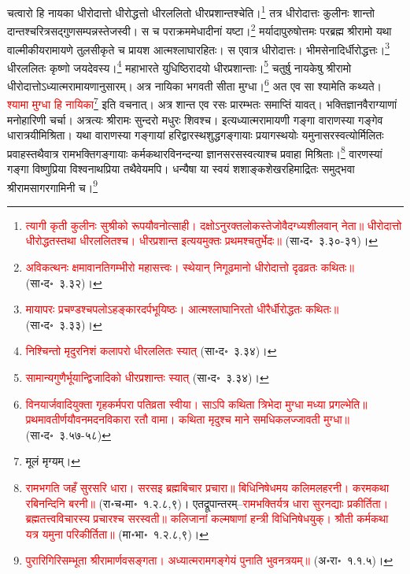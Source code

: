 \begin{sloppypar}\justifying\noindent\hspace{10mm} चत्वारो हि नायका धीरोदात्तो धीरोद्धत्तो धीरललितो धीरप्रशान्तश्चेति।\footnote{\textcolor{red}{त्यागी कृती कुलीनः सुश्रीको रूपयौवनोत्साही। दक्षोऽनुरक्तलोकस्तेजोवैदग्ध्यशीलवान् नेता॥ धीरोदात्तो धीरोद्धतस्तथा धीरललितश्च। धीरप्रशान्त इत्ययमुक्तः प्रथमश्चतुर्भेदः॥} (सा॰द॰~३.३०-३१)।} तत्र धीरोदात्तः कुलीनः शान्तो दान्तश्चरित्र\-सद्गुण\-सम्पन्नस्तेजस्वी। स च पराक्रम\-मेधादीनां यष्टा।\footnote{\textcolor{red}{अविकत्थनः क्षमावानतिगम्भीरो महासत्त्वः। स्थेयान् निगूढमानो धीरोदात्तो दृढव्रतः कथितः॥} (सा॰द॰~३.३२)।} मर्यादा\-पुरुषोत्तमः पर\-ब्रह्म श्रीरामो यथा वाल्मीकीय\-रामायणे तुलसी\-कृते च प्रायश आत्म\-श्लाघा\-रहितः। स एवात्र धीरोदात्तः। भीमसेनादिर्धीरोद्धत्तः।\footnote{\textcolor{red}{मायापरः प्रचण्डश्चपलोऽहङ्कारदर्पभूयिष्ठः। आत्मश्लाघानिरतो धीरैर्धीरोद्धतः कथितः॥} (सा॰द॰~३.३३)।} धीरललितः कृष्णो जयदेवस्य।\footnote{\textcolor{red}{निश्चिन्तो मृदुरनिशं कलापरो धीरललितः स्यात्} (सा॰द॰~३.३४)।}
महाभारते युधिष्ठिरादयो धीर\-प्रशान्ताः।\footnote{\textcolor{red}{सामान्यगुणैर्भूयान्द्विजादिको धीरप्रशान्तः स्यात्} (सा॰द॰~३.३४)।} चतुर्षु नायकेषु श्रीरामो धीरोदात्तोऽध्यात्म\-रामायणानुसारम्। अत्र नायिका भगवती सीता मुग्धा।\footnote{\textcolor{red}{विनयार्जवादियुक्ता गृहकर्मपरा पतिव्रता स्वीया। साऽपि कथिता त्रिभेदा मुग्धा मध्या प्रगल्भेति॥ प्रथमावतीर्णयौवनमदनविकारा रतौ वामा। कथिता मृदुश्च माने समधिकलज्जावती मुग्धा॥} (सा॰द॰~३.५७-५८)} अत एव सा श्यामेति कथ्यते। \textcolor{red}{श्यामा मुग्धा हि नायिका}\footnote{मूलं मृग्यम्।} इति वचनात्। अत्र शान्त एव रसः प्रारम्भतः समाप्तिं यावत्। भक्ति\-ज्ञान\-वैराग्याणां मनोहारिणी चर्चा। अत्रत्यः श्रीरामः सुन्दरो मधुरः शिवश्च। इत्यध्यात्म\-रामायणी गङ्गा वाराणस्या गङ्गेव धारा\-त्रयी\-मिश्रिता। यथा वाराणस्या गङ्गायां हरिद्वारस्थ\-शुद्ध\-गङ्गायाः प्रयागस्थयोः यमुना\-सरस्वत्योर्मिलितः प्रवाहस्तथैवात्र राम\-भक्ति\-गङ्गायाः कर्म\-कथा\-रवि\-नन्दन्या ज्ञान\-सरसस्वत्याश्च प्रवाहा मिश्रिताः।\footnote{\textcolor{red}{रामभगति जहँ सुरसरि धारा। सरसइ ब्रह्मबिचार प्रचारा॥ बिधिनिषेधमय कलिमलहरनी। करमकथा रबिनन्दिनि बरनी॥} (रा॰च॰मा॰~१.२.८,९)। एतद्रूपान्तरम्–\textcolor{red}{रामभक्तिर्यत्र धारा सुरनद्याः प्रकीर्तिता। ब्रह्मतत्त्वविचारस्य प्रचारश्च सरस्वती॥ कलिजानां कल्मषाणां हन्त्री विधिनिषेधयुक्। श्रौती कर्मकथा यत्र यमुना परिकीर्तिता॥} (मा॰भा॰~१.२.८,९)। } वारणस्यां गङ्गा विष्णु\-प्रिया विश्वनाथ\-प्रिया तथैवेयमपि। धन्यैषा या स्वयं शशाङ्क\-शेखर\-हिमाद्रितः समुद्भवा श्रीराम\-सागर\-गामिनी च।\footnote{\textcolor{red}{पुरारिगिरिसम्भूता श्रीरामार्णवसङ्गता। अध्यात्मरामगङ्गेयं पुनाति भुवनत्रयम्॥} (अ॰रा॰~१.१.५)।}\end{sloppypar}
